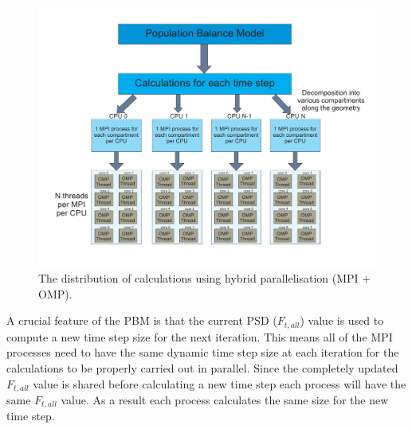 \documentclass[preprint,11pt,authoryear]{elsarticle}
\begin{document}
\begin{figure}[H]
\centering
\includegraphics[scale=0.5]{PBM_decomposition.pdf}
\caption{The distribution of calculations using hybrid parallelisation (MPI + OMP).}
\label{fig:mthds_PBM_decompostion}
\end{figure}

\par A crucial feature of the PBM is that the current PSD ($F_{t,all}$) value is used to compute a new time step size for the next iteration. This means all of the MPI processes need to have the same dynamic time step size at each iteration for the calculations to be properly carried out in parallel. Since the completely updated $F_{t,all}$ value is shared before calculating a new time step each process will have the same $F_{t,all}$ value. As a result each process calculates the same size for the new time step. 
\end{document}
